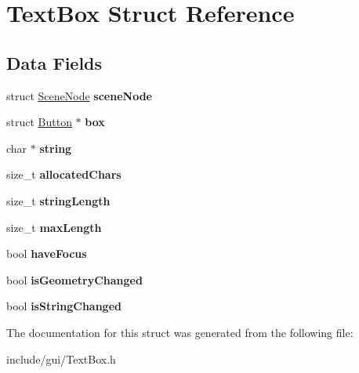 \hypertarget{struct_text_box}{}\section{Text\+Box Struct Reference}
\label{struct_text_box}
\subsection*{Data Fields}
\begin{DoxyCompactItemize}
\item 
\hypertarget{struct_text_box_aca8025f56fb4ce20b974ec9a3292a9e4}{}\label{struct_text_box_aca8025f56fb4ce20b974ec9a3292a9e4} 
struct \hyperlink{struct_scene_node}{Scene\+Node} {\bfseries scene\+Node}
\item 
\hypertarget{struct_text_box_a548acc7030d1ae8d0b510cc513e4130e}{}\label{struct_text_box_a548acc7030d1ae8d0b510cc513e4130e} 
struct \hyperlink{struct_button}{Button} $\ast$ {\bfseries box}
\item 
\hypertarget{struct_text_box_aed1cfb225a5fb77461e7972691e68a72}{}\label{struct_text_box_aed1cfb225a5fb77461e7972691e68a72} 
char $\ast$ {\bfseries string}
\item 
\hypertarget{struct_text_box_a7c9905d1a530f3eed43ee1f2a172f5fb}{}\label{struct_text_box_a7c9905d1a530f3eed43ee1f2a172f5fb} 
size\+\_\+t {\bfseries allocated\+Chars}
\item 
\hypertarget{struct_text_box_a1db9ad026f0a1b2c4d79cb863e2dfd10}{}\label{struct_text_box_a1db9ad026f0a1b2c4d79cb863e2dfd10} 
size\+\_\+t {\bfseries string\+Length}
\item 
\hypertarget{struct_text_box_a304337cd03cb35fff8d419d0a085eac6}{}\label{struct_text_box_a304337cd03cb35fff8d419d0a085eac6} 
size\+\_\+t {\bfseries max\+Length}
\item 
\hypertarget{struct_text_box_ad15d64ccb6e24fbcf40345ac7a4b1230}{}\label{struct_text_box_ad15d64ccb6e24fbcf40345ac7a4b1230} 
bool {\bfseries have\+Focus}
\item 
\hypertarget{struct_text_box_a8ea7e8ac3e3330830aa7a4309390f3ac}{}\label{struct_text_box_a8ea7e8ac3e3330830aa7a4309390f3ac} 
bool {\bfseries is\+Geometry\+Changed}
\item 
\hypertarget{struct_text_box_a1c6db9813ce047719bb6c91e0c161240}{}\label{struct_text_box_a1c6db9813ce047719bb6c91e0c161240} 
bool {\bfseries is\+String\+Changed}
\end{DoxyCompactItemize}


The documentation for this struct was generated from the following file\+:\begin{DoxyCompactItemize}
\item 
include/gui/Text\+Box.\+h\end{DoxyCompactItemize}
